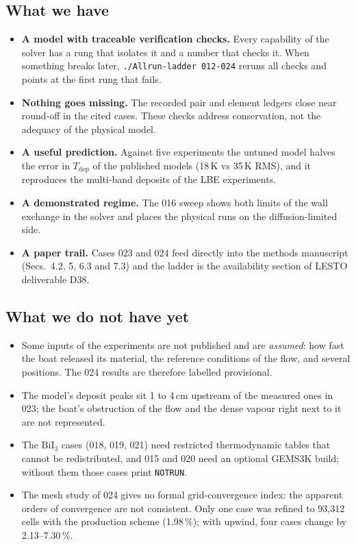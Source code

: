 \documentclass[10pt,a4paper]{article}
\newcommand{\BiI}{\ensuremath{\mathrm{BiI}_3}}
\newcommand{\Tdep}{\ensuremath{T_\mathrm{dep}}}
\begin{document}
\subsection{What we have}
\begin{itemize}
  \item \textbf{A model with traceable verification checks.} Every capability of the
    solver has a rung that isolates it and a number that checks it. When
    something breaks later, \texttt{./Allrun-ladder 012-024} reruns all
    checks and points at the first rung that fails.
  \item \textbf{Nothing goes missing.} The recorded pair and element ledgers close near
    round-off in the cited cases. These checks address conservation, not
    the adequacy of the physical model.
  \item \textbf{A useful prediction.} Against five experiments the
    untuned model halves the error in \Tdep{} of the published models
    (18\,K vs 35\,K RMS), and it reproduces the multi-band deposits of the
    LBE experiments.
  \item \textbf{A demonstrated regime.} The 016 sweep shows both limits
    of the wall exchange in the solver and places the physical runs on
    the diffusion-limited side.
  \item \textbf{A paper trail.} Cases 023 and 024 feed directly into the
    methods manuscript (Secs.~4.2, 5, 6.3 and 7.3) and the ladder is the
    availability section of LESTO deliverable D38.
\end{itemize}

\subsection{What we do not have yet}
\begin{itemize}
  \item Some inputs of the experiments are not published and are
    \emph{assumed}: how fast the boat released its material, the reference
    conditions of the flow, and several positions. The 024 results are
    therefore labelled provisional.
  \item The model's deposit peaks sit 1 to 4\,cm upstream of the measured
    ones in 023; the boat's obstruction of the flow and the dense vapour
    right next to it are not represented.
  \item The \BiI{} cases (018, 019, 021) need restricted thermodynamic
    tables that cannot be redistributed, and 015 and 020 need an optional
    GEMS3K build; without them those cases print \texttt{NOTRUN}.
  \item The mesh study of 024 gives no formal grid-convergence index: the
    apparent orders of convergence are not consistent. Only one case was
    refined to 93,312 cells with the production scheme (1.98\,\%); with
    upwind, four cases change by 2.13--7.30\,\%.
\end{itemize}
\end{document}

